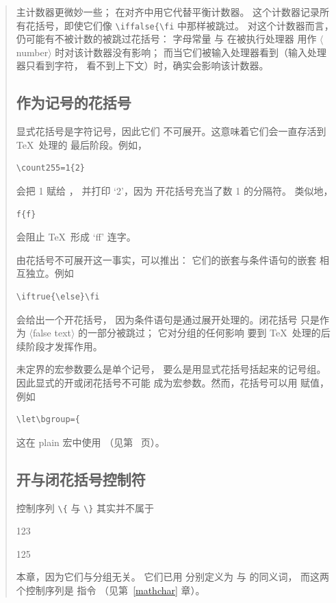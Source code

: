 \documentclass[a4paper]{rapport3}
\makeatletter
\def\lb{{\tt\char`\{}}\def\rb{{\tt\char`\}}}
\def\gr#1{$\langle$#1$\rangle$}\def\key#1{{\tt#1}}
\newenvironment{disp}{\begin{quotation}}{\end{quotation}}
\def\cstoidx#1\par{\index{#1@\cs{#1}}}
\makeatother
\begin{document}
\begin{disp}
主计数器更微妙一些；
在对齐中用它代替平衡计数器。
这个计数器记录所有花括号，即使它们像
\verb>\iffalse{\fi> 中那样被跳过。
对这个计数器而言，仍可能有不被计数的被跳过花括号：
字母常量 \n{`\lb} 与 \n{`\rb} 在被执行处理器
用作 \gr{number} 时对该计数器没有影响；
而当它们被输入处理器看到（输入处理器只看到字符，
看不到上下文）时，确实会影响该计数器。

\subsection{作为记号的花括号}

显式花括号是字符记号，因此它们
不可展开。这意味着它们会一直存活到 \TeX\ 处理的
最后阶段。例如，
\begin{verbatim}
\count255=1{2}
\end{verbatim}
会把 1 赋给 ，
并打印 `2'，因为
开花括号充当了数 1 的分隔符。
类似地， \begin{verbatim}
f{f}
\end{verbatim}
会阻止 \TeX\ 形成
`\hbox{ff}' 连字。

由花括号不可展开这一事实，可以推出：
它们的嵌套与条件语句的嵌套
相互独立。例如
\begin{verbatim}
\iftrue{\else}\fi
\end{verbatim}
会给出一个开花括号，
因为条件语句是通过展开处理的。闭花括号
只是作为 \gr{false text} 的一部分被跳过；
它对分组的任何影响
要到 \TeX\ 处理的后续阶段才发挥作用。

未定界的宏参数要么是单个记号，
要么是用显式花括号括起来的记号组。
因此显式的开或闭花括号不可能
成为宏参数。然而，花括号可以用  赋值，
例如 \begin{verbatim}
\let\bgroup={
\end{verbatim}
这在 plain  宏中使用
（见第~\pageref{footnote:ex} 页）。

\subsection{开与闭花括号控制符}

控制序列 \verb-\{- 与 \verb-\}- 其实并不属于
\cstoidx\char123\par\cstoidx\char125\par
本章，因为它们与分组无关。
它们已用  分别定义为
 与  的同义词，
而这两个控制序列是  指令
（见第~\ref{mathchar} 章）。


\end{disp}
\end{document}

